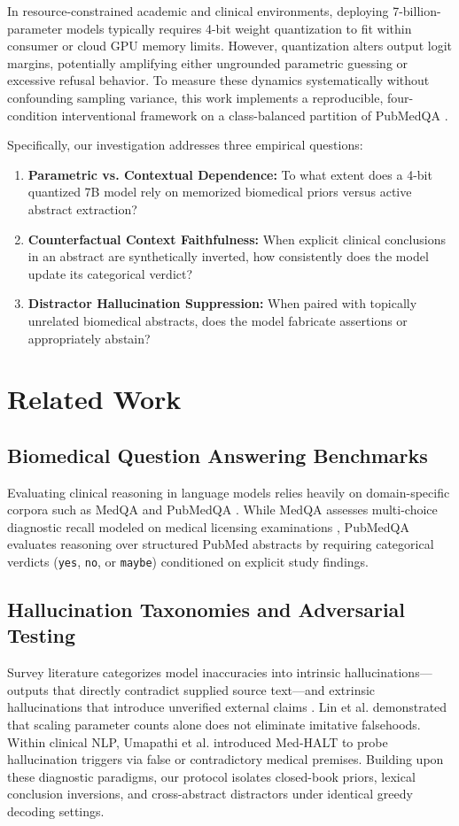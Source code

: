\documentclass[10pt,twocolumn,letterpaper]{article}
\begin{document}
In resource-constrained academic and clinical environments, deploying 7-billion-parameter models typically requires 4-bit weight quantization to fit within consumer or cloud GPU memory limits. However, quantization alters output logit margins, potentially amplifying either ungrounded parametric guessing or excessive refusal behavior. To measure these dynamics systematically without confounding sampling variance, this work implements a reproducible, four-condition interventional framework on a class-balanced partition of PubMedQA \cite{jin2019pubmedqa}.

Specifically, our investigation addresses three empirical questions:
\begin{enumerate}
    \item \textbf{Parametric vs. Contextual Dependence:} To what extent does a 4-bit quantized 7B model rely on memorized biomedical priors versus active abstract extraction?
    \item \textbf{Counterfactual Context Faithfulness:} When explicit clinical conclusions in an abstract are synthetically inverted, how consistently does the model update its categorical verdict?
    \item \textbf{Distractor Hallucination Suppression:} When paired with topically unrelated biomedical abstracts, does the model fabricate assertions or appropriately abstain?
\end{enumerate}

\section{Related Work}
\subsection{Biomedical Question Answering Benchmarks}
Evaluating clinical reasoning in language models relies heavily on domain-specific corpora such as MedQA \cite{jin2021disease} and PubMedQA \cite{jin2019pubmedqa}. While MedQA assesses multi-choice diagnostic recall modeled on medical licensing examinations \cite{singhal2023large,singhal2023towards}, PubMedQA evaluates reasoning over structured PubMed abstracts by requiring categorical verdicts (\texttt{yes}, \texttt{no}, or \texttt{maybe}) conditioned on explicit study findings.

\subsection{Hallucination Taxonomies and Adversarial Testing}
Survey literature categorizes model inaccuracies into intrinsic hallucinations—outputs that directly contradict supplied source text—and extrinsic hallucinations that introduce unverified external claims \cite{huang2023survey,rawte2023survey}. Lin et al. \cite{lin2022truthfulqa} demonstrated that scaling parameter counts alone does not eliminate imitative falsehoods. Within clinical NLP, Umapathi et al. \cite{umapathi2023medhalt} introduced Med-HALT to probe hallucination triggers via false or contradictory medical premises. Building upon these diagnostic paradigms, our protocol isolates closed-book priors, lexical conclusion inversions, and cross-abstract distractors under identical greedy decoding settings.
\end{document}
